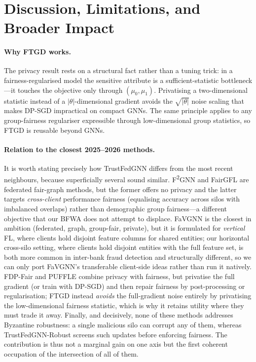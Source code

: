 \documentclass[pdflatex,sn-mathphys-num]{sn-jnl}
\theoremstyle{thmstyleone}%
\theoremstyle{thmstyletwo}%
\theoremstyle{thmstylethree}%
\begin{document}
\begin{table}[t]\centering\small
\caption{Mapping of TrustFedGNN components to EU AI Act articles and NIST AI RMF
functions.}
\label{tab:compliance}

\end{table}

\section{Discussion, Limitations, and Broader Impact}
\label{sec:discussion}

\paragraph{Why FTGD works.}
The privacy result rests on a structural fact rather than a tuning trick: in a
fairness-regularised model the sensitive attribute is a sufficient-statistic
bottleneck---it touches the objective only through $(\mu_0,\mu_1)$. Privatising
a two-dimensional statistic instead of a $|\theta|$-dimensional gradient avoids
the $\sqrt{|\theta|}$ noise scaling that makes DP-SGD impractical on compact
GNNs. The same principle applies to any group-fairness regulariser expressible
through low-dimensional group statistics, so FTGD is reusable beyond GNNs.

\paragraph{Relation to the closest 2025--2026 methods.}
It is worth stating precisely how TrustFedGNN differs from the most recent
neighbours, because superficially several sound similar. F\textsuperscript{2}GNN
and FairGFL are federated fair-graph methods, but the former offers no privacy
and the latter targets \emph{cross-client} performance fairness (equalising
accuracy across silos with imbalanced overlaps) rather than demographic group
fairness---a different objective that our BFWA does not attempt to displace.
FaVGNN is the closest in ambition (federated, graph, group-fair, private), but
it is formulated for \emph{vertical} FL, where clients hold disjoint feature
columns for shared entities; our horizontal cross-silo setting, where clients
hold disjoint entities with the full feature set, is both more common in
inter-bank fraud detection and structurally different, so we can only port
FaVGNN's transferable client-side ideas rather than run it natively. FDP-Fair
and PUFFLE combine privacy with fairness, but privatise the full gradient (or
train with DP-SGD) and then repair fairness by post-processing or regularisation;
FTGD instead \emph{avoids} the full-gradient noise entirely by privatising the
low-dimensional fairness statistic, which is why it retains utility where they
must trade it away. Finally, and decisively, none of these methods addresses
Byzantine robustness: a single malicious silo can corrupt any of them, whereas
TrustFedGNN-Robust screens such updates before enforcing fairness. The
contribution is thus not a marginal gain on one axis but the first coherent
occupation of the intersection of all of them.
\end{document}
